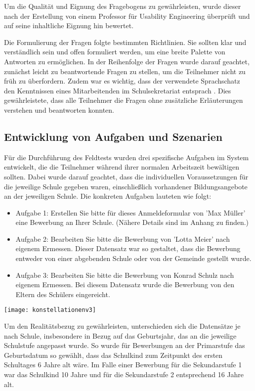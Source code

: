 Um die Qualität und Eignung des Fragebogens zu gewährleisten, wurde dieser nach der Erstellung von einem Professor für Usability Engineering überprüft und auf seine inhaltliche Eignung hin bewertet.

Die Formulierung der Fragen folgte bestimmten Richtlinien. Sie sollten klar und verständlich sein und offen formuliert werden, um eine breite Palette von Antworten zu ermöglichen. In der Reihenfolge der Fragen wurde darauf geachtet, zunächst leicht zu beantwortende Fragen zu stellen, um die Teilnehmer nicht zu früh zu überfordern. Zudem war es wichtig, dass der verwendete Sprachschatz den Kenntnissen eines Mitarbeitenden im Schulsekretariat entsprach \cite{Kruse_2015}. Dies gewährleistete, dass alle Teilnehmer die Fragen ohne zusätzliche Erläuterungen verstehen und beantworten konnten.

\subsection{Entwicklung von Aufgaben und Szenarien}

Für die Durchführung des Feldtests wurden drei spezifische Aufgaben im System entwickelt, die die Teilnehmer während ihrer normalen Arbeitszeit bewältigen sollten. Dabei wurde darauf geachtet, dass die individuellen  Voraussetzungen für die jeweilige Schule gegeben waren, einschließlich  vorhandener Bildungsangebote an der jeweiligen Schule. Die konkreten Aufgaben lauteten wie folgt:

\begin{itemize}
\item Aufgabe 1: \glqq Erstellen Sie bitte für dieses Anmeldeformular von 'Max Müller' eine Bewerbung an Ihrer Schule.\grqq{}  (Nähere Details sind im Anhang zu finden.)
\item Aufgabe 2: \glqq Bearbeiten Sie bitte die Bewerbung von 'Lotta Meier' nach eigenem Ermessen.\grqq{}  Dieser Datensatz war so gestaltet, dass die Bewerbung entweder von einer abgebenden Schule oder von der Gemeinde gestellt wurde.
\item Aufgabe 3: \glqq Bearbeiten Sie bitte die Bewerbung von Konrad Schulz nach eigenem Ermessen.\grqq{}  Bei diesem Datensatz wurde die Bewerbung von den Eltern des Schülers eingereicht.
\end{itemize}

\texttt{[image: konstellationenv3]}


Um den Realitätsbezug zu gewährleisten, unterschieden sich die Datensätze je nach Schule, insbesondere in Bezug auf das Geburtsjahr, das an die jeweilige Schulstufe angepasst wurde. So wurde für Bewerbungen an der Primarstufe das Geburtsdatum so gewählt, dass das Schulkind zum Zeitpunkt des ersten Schultages 6 Jahre alt wäre. Im Falle einer Bewerbung für die Sekundarstufe 1 war das Schulkind 10 Jahre und für die Sekundarstufe 2 entsprechend 16 Jahre alt.

